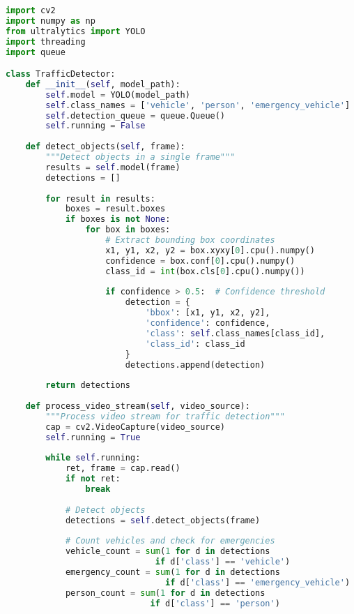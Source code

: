 \begin{lstlisting}[language=Python, caption=Real-time Object Detection]
import cv2
import numpy as np
from ultralytics import YOLO
import threading
import queue

class TrafficDetector:
    def __init__(self, model_path):
        self.model = YOLO(model_path)
        self.class_names = ['vehicle', 'person', 'emergency_vehicle']
        self.detection_queue = queue.Queue()
        self.running = False
        
    def detect_objects(self, frame):
        """Detect objects in a single frame"""
        results = self.model(frame)
        detections = []
        
        for result in results:
            boxes = result.boxes
            if boxes is not None:
                for box in boxes:
                    # Extract bounding box coordinates
                    x1, y1, x2, y2 = box.xyxy[0].cpu().numpy()
                    confidence = box.conf[0].cpu().numpy()
                    class_id = int(box.cls[0].cpu().numpy())
                    
                    if confidence > 0.5:  # Confidence threshold
                        detection = {
                            'bbox': [x1, y1, x2, y2],
                            'confidence': confidence,
                            'class': self.class_names[class_id],
                            'class_id': class_id
                        }
                        detections.append(detection)
        
        return detections
    
    def process_video_stream(self, video_source):
        """Process video stream for traffic detection"""
        cap = cv2.VideoCapture(video_source)
        self.running = True
        
        while self.running:
            ret, frame = cap.read()
            if not ret:
                break
                
            # Detect objects
            detections = self.detect_objects(frame)
            
            # Count vehicles and check for emergencies
            vehicle_count = sum(1 for d in detections 
                              if d['class'] == 'vehicle')
            emergency_count = sum(1 for d in detections 
                                if d['class'] == 'emergency_vehicle')
            person_count = sum(1 for d in detections 
                             if d['class'] == 'person')
            

\end{lstlisting}
